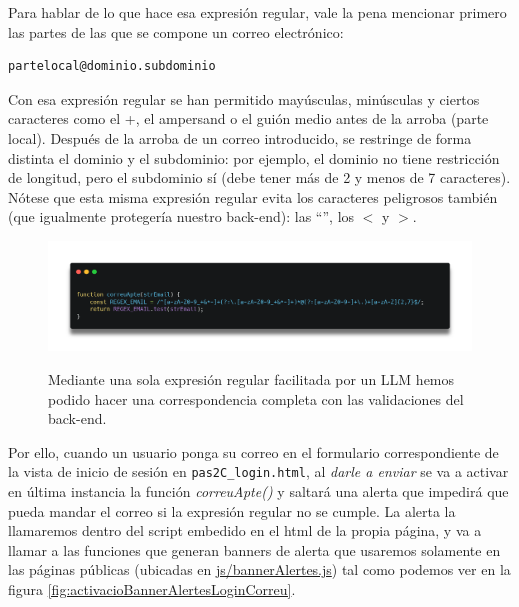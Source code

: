 \documentclass[a4paper,12pt]{report}
\begin{document}
		Para hablar de lo que hace esa expresión regular, vale la pena mencionar primero las partes de las que se compone un correo electrónico:
		
		\begin{lstlisting}[language=xml, basicstyle=\ttfamily\small]
		partelocal@dominio.subdominio
		\end{lstlisting}
		

		
		Con esa expresión regular se han permitido mayúsculas, minúsculas y ciertos caracteres como el +, el ampersand o el guión medio antes de la arroba (parte local). Después de la arroba de un correo introducido, se restringe de forma distinta el dominio y el subdominio: por ejemplo, el dominio no tiene restricción de longitud, pero el subdominio sí (debe tener más de 2 y menos de 7 caracteres). Nótese que esta misma expresión regular evita los caracteres peligrosos también (que igualmente protegería nuestro back-end): las ``'', los $<$ y $>$.
		
		\FloatBarrier
		\setlength{\belowcaptionskip}{0pt}
		\begin{figure}[H]
			\centering
			\caption[Detalle de validación del correo (js/regexMail.js)]{Mediante una sola expresión regular facilitada por un LLM hemos podido hacer una correspondencia completa con las validaciones del back-end.}
			\includegraphics[width=1\linewidth]{img/regexMail}
			\label{fig:regexMail}
		\end{figure}
		\FloatBarrier
	
	
		Por ello, cuando un usuario ponga su correo en el formulario correspondiente de la vista de inicio de sesión en \texttt{pas2C\_login.html}, al \textit{darle a enviar} se va a activar en última instancia la función \textit{correuApte()} y saltará una alerta que impedirá que pueda mandar el correo si la expresión regular no se cumple. La alerta la llamaremos dentro del script embedido en el html de la propia página, y va a llamar a las funciones que generan banners de alerta que usaremos solamente en las páginas públicas (ubicadas en \href{https://github.com/blackcub3s/mercApp/blob/main/APP%20WEB/__frontend__produccio__/app/js/bannerAlertes.js}{js/bannerAlertes.js}) tal como podemos ver en la figura \ref{fig:activacioBannerAlertesLoginCorreu}.
		
\end{document}
